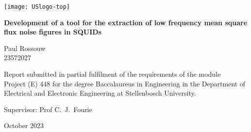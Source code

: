 \graphicspath{{frontmatter/fig/}}

\begin{titlepage}
	\begin{center}
		
		\texttt{[image: USlogo-top]}
		
		\vfill
		
		{\sffamily \bfseries \huge Development of a tool for the extraction of low frequency mean square flux noise figures in SQUIDs \par}
		
		\vfill
		
		{\large {\Large Paul Rossouw} \\ 23572027 \par}
		
		\vfill
		
		\vfill
		
		{Report submitted in partial fulfilment of the requirements of the module \\
			Project (E) 448 for the degree Baccalaureus in Engineering in the Department of
			Electrical and Electronic Engineering at Stellenbosch University. \par}
		
		\vfill
		
		{\large {Supervisor}: Prof C.\ J.\ Fourie} %
		
		\vfill
		
		{\Large October 2023}
	\end{center}
\end{titlepage}
